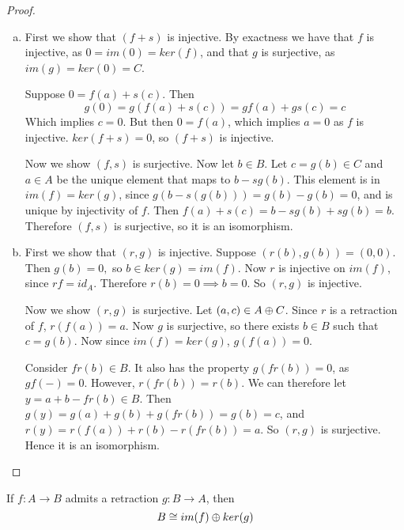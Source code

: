 \begin{proof}
\begin{enumerate}[(a)]
\item First we show that $(f+s)$ is injective. By exactness we have that $f$ is injective, as $0=im(0)=ker(f)$, and that $g$ is surjective, as $im(g)=ker(0)=C$.

Suppose $0=f(a)+s(c)$. Then $$g(0)=g(f(a)+s(c))=gf(a)+gs(c)=c$$
Which implies $c=0$. But then $0=f(a)$, which implies $a=0$ as $f$ is injective. $ker(f+s)=0$, so $(f+s)$ is injective.

Now we show $(f,s)$ is surjective. Now let $b\in B$. Let $c=g(b)\in C$ and $a\in A$ be the unique element that maps to $b-sg(b)$. This element is in $im(f)=ker(g)$, since $g(b-s(g(b)))=g(b)-g(b)=0$, and is unique by injectivity of $f$. Then $f(a)+s(c)=b-sg(b)+sg(b)=b$. Therefore $(f,s)$ is surjective, so it is an isomorphism.

\item First we show that $(r,g)$ is injective. Suppose $(r(b),g(b))=(0,0)$. Then $g(b)=0,$ so $b\in ker(g)=im(f)$. Now $r$ is injective on $im(f)$, since $rf=id_A$. Therefore $r(b)=0\implies b=0$. So $(r,g)$ is injective.

Now we show $(r,g)$ is surjective. Let $(a,c)\in A\oplus C$. Since $r$ is a retraction of $f$, $r(f(a))=a$. Now $g$ is surjective, so there exists $b\in B$ such that $c=g(b)$. Now since $im(f)=ker(g)$, $g(f(a))=0$. 

Consider $fr(b)\in B$. It also has the property $g(fr(b))=0$, as $gf(-)=0$. However, $r(fr(b))=r(b)$. We can therefore let $y=a+b-fr(b)\in B$. Then $g(y)=g(a)+g(b)+g(fr(b))=g(b)=c$, and $r(y)=r(f(a))+r(b)-r(fr(b))=a$. So $(r,g)$ is surjective. Hence it is an isomorphism.


\end{enumerate}

\end{proof}

\begin{corollary}\label{retraction-iso}
If $f:A\rightarrow B$ admits a retraction $g:B\rightarrow A$, then $$B\cong im(f)\oplus ker(g)$$
\end{corollary}

